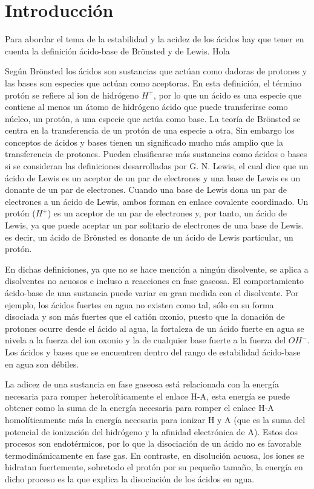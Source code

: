 \chapter{Introducción}
Para abordar el tema de la estabilidad y la acidez de los ácidos hay que tener en cuenta la definición ácido-base de Brönsted y de Lewis. Hola

Según Brönsted los ácidos son sustancias que actúan como dadoras de protones y las bases son especies que actúan como aceptoras. En esta definición, el término protón se refiere al ion de hidrógeno $H^+$, por lo que un ácido es una especie que contiene al menos un átomo de hidrógeno ácido que puede transferirse como núcleo, un protón, a una especie que actúa como base. La teoría de Brönsted se centra en la transferencia de un protón de una especie a otra, Sin embargo los conceptos de ácidos y bases tienen un significado mucho más amplio que la transferencia de protones. Pueden clasificarse más sustancias como ácidos o bases si se consideran las definiciones desarrolladas por G. N. Lewis, el cual dice que un ácido de Lewis es un aceptor de un par de electrones y una base de Lewis es un donante de un par de electrones. Cuando una base de Lewis dona un par de electrones a un ácido de Lewis, ambos forman en enlace covalente coordinado. Un protón ($H^+$) es un aceptor de un par de electrones y, por tanto, un ácido de Lewis, ya que puede aceptar un par solitario de electrones de una base de Lewis. es decir, un ácido de Brönsted es donante de un ácido de Lewis particular, un protón. 

En dichas definiciones, ya que no se hace mención a ningún disolvente, se aplica a disolventes no acuosos e incluso a reacciones en fase gaseosa. El comportamiento ácido-base de una sustancia puede variar en gran medida con el disolvente. Por ejemplo, los ácidos fuertes en agua no existen como tal, sólo en su forma disociada y son más fuertes que el catión oxonio, puesto que la donación de protones ocurre desde el ácido al agua, la fortaleza de un ácido fuerte en agua se nivela a la fuerza del ion oxonio y la de cualquier base fuerte a la fuerza del $OH ^-$. Los ácidos y bases que se encuentren dentro del rango de estabilidad ácido-base en agua son débiles. \cite {quimica1}

La adicez de una sustancia en fase gaseosa está relacionada con la energía necesaria para romper heterolíticamente el enlace H-A, esta energía se puede obtener como la suma de la energía necesaria para romper el enlace H-A homolíticamente más la energía necesaria para ionizar H y A (que es la suma del potencial de ionización del hidrógeno y la afinidad electrónica de A). Estos dos procesos son endotérmicos, por lo que la disociación de un ácido no es favorable termodinámicamente en fase gas. En contraste, en disolución acuosa, los iones se hidratan fuertemente, sobretodo el protón por su pequeño tamaño, la energía en dicho proceso es la que explica la disociación de los ácidos en agua.

